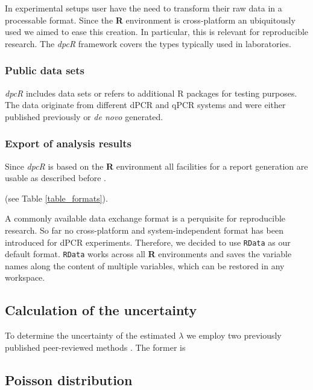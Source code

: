 \documentclass[a4,center,fleqn]{NAR}
\begin{document}
In experimental setups user have the need to transform their raw data in a 
processable format. Since the \textbf{R} environment is cross-platform an 
ubiquitously used we aimed to ease this creation. In particular, this is 
relevant for reproducible research. The \textit{dpcR} framework covers the 
types 
typically used in laboratories.

\subsubsection{Public data sets}

\textit{dpcR} includes data sets or refers to additional R packages for testing 
purposes. The data originate from different dPCR and qPCR systems and were 
either published previously \cite{whale_comparison_2012, roediger2015chippcr, 
white_digital_2009, rodiger_r_2015, dorazio_statistical_2015} or \textit{de 
novo} generated.

\subsubsection{Export of analysis results}

Since \textit{dpcR} is based on the \textbf{R} environment all facilities for a 
report generation are usable as described before \cite{rodiger_r_2015}.

(see Table \ref{table_formats}).

A commonly available data exchange format is a perquisite for reproducible 
research. So far no cross-platform and system-independent format has been 
introduced for dPCR experiments. Therefore, we decided to use \texttt{RData} as 
our default format. \texttt{RData} works across all \textbf{R} environments and 
saves the variable names along the content of multiple variables, which can be 
restored in any workspace.

\subsection{Calculation of the uncertainty}

To determine the uncertainty of the estimated $\lambda$ we employ two 
previously 
published peer-reviewed methods \cite{dube_mathematical_2008, bhat_single_2009}.
The former is

\subsection{Poisson distribution}
\end{document}
